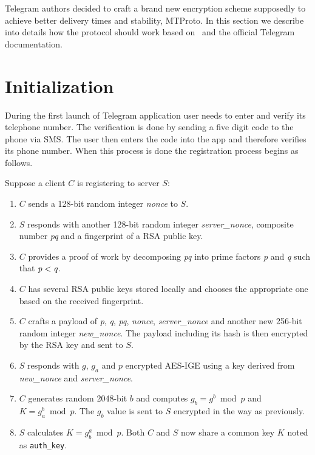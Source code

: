 \documentclass[thesis=M,english]{FITthesis}[2012/10/20]
\begin{document}
Telegram authors decided to craft a brand new encryption scheme supposedly to achieve better delivery times and stability, MTProto. In this section we describe into details how the protocol should work based on~\cite{telegram-aarhus} and the official Telegram documentation.


\section{Initialization}\label{crypto-initialization}

During the first launch of Telegram application user needs to enter and verify its telephone number. The verification is done by sending a five digit code to the phone via SMS. The user then enters the code into the app and therefore verifies its phone number. When this process is done the registration process begins as follows.

Suppose a client $C$ is registering to server $S$:

\begin{enumerate}
	\item $C$ sends a 128-bit random integer \emph{nonce} to $S$.
	\item $S$ responds with another 128-bit random integer \emph{server\_nonce}, composite number \emph{pq} and a fingerprint of a RSA public key.
	\item $C$ provides a proof of work by decomposing \emph{pq} into prime factors \emph{p} and \emph{q} such that $\emph{p} < \emph{q}$.
	\item $C$ has several RSA public keys stored locally and chooses the appropriate one based on the received fingerprint.
	\item $C$ crafts a payload of \emph{p}, \emph{q}, \emph{pq}, \emph{nonce}, \emph{server\_nonce} and another new 256-bit random integer \emph{new\_nonce}. The payload including its hash is then encrypted by the RSA key and sent to $S$.
	\item $S$ responds with $g$, $g_a$ and $p$ encrypted AES-IGE using a key derived from \emph{new\_nonce} and \emph{server\_nonce}.\label{crypto-initialization-6}
	\item $C$ generates random 2048-bit $b$ and computes $g_b = g^b \bmod p$ and $K = g_a^b \bmod p$. The $g_b$ value is sent to $S$ encrypted in the way as previously.
	\item $S$ calculates $K = g_b^a \bmod p$. Both $C$ and $S$ now share a common key $K$ noted as \texttt{auth\_key}.
\end{enumerate}
\end{document}
